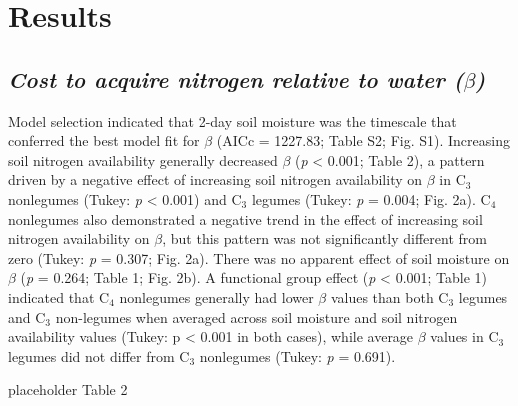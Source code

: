 \section{Results}
\subsection{\textit{Cost to acquire nitrogen relative to water ($\beta$)}}
Model selection indicated that 2-day soil moisture was the timescale that conferred the best model fit for $\beta$ (AICc = 1227.83; Table S2; Fig. S1). Increasing soil nitrogen availability generally decreased $\beta$ (\textit{p} < 0.001; Table 2), a pattern driven by a negative effect of increasing soil nitrogen availability on $\beta$ in C$_3$ nonlegumes (Tukey: \textit{p} < 0.001) and C$_3$ legumes (Tukey: \textit{p} = 0.004; Fig. 2a). C$_4$ nonlegumes also demonstrated a negative trend in the effect of increasing soil nitrogen availability on $\beta$, but this pattern was not significantly different from zero (Tukey: \textit{p} = 0.307; Fig. 2a). There was no apparent effect of soil moisture on $\beta$ (\textit{p} = 0.264; Table 1; Fig. 2b). A functional group effect (\textit{p} < 0.001; Table 1) indicated that C$_4$ nonlegumes generally had lower $\beta$ values than both C$_3$ legumes and C$_3$ non-legumes when averaged across soil moisture and soil nitrogen availability values (Tukey: p < 0.001 in both cases), while average $\beta$ values in C$_3$ legumes did not differ from C$_3$ nonlegumes (Tukey: \textit{p} = 0.691).

\newpage
placeholder Table 2
\clearpage

